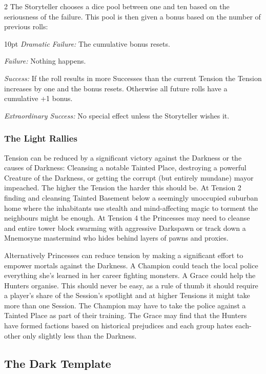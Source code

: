 \begin{multicols}{2}
The Storyteller chooses a dice pool between one and ten based on the seriousness of the failure. This pool is then given a bonus based on the number of previous rolls: 

\begin{myindentpar}{10pt}
    \emph{Dramatic Failure:} The cumulative bonus resets. 
    
    \emph{Failure:} Nothing happens. 
    
    \emph{Success:} If the roll results in more Successes than the current Tension the Tension increases by one and the bonus resets. Otherwise all future rolls have a cumulative +1 bonus. 
    
    \emph{Extraordinary Success:} No special effect unless the Storyteller wishes it. 
\end{myindentpar}

\subsubsection*{The Light Rallies}

Tension can be reduced by a significant victory against the Darkness or the causes of Darkness: Cleansing a notable Tainted Place, destroying a powerful Creature of the Darkness, or getting the corrupt (but entirely mundane) mayor impeached. The higher the Tension the harder this should be. At Tension 2 finding and cleansing Tainted Basement below a seemingly unoccupied suburban home where the inhabitants use stealth and mind-affecting magic to torment the neighbours might be enough. At Tension 4 the Princesses may need to cleanse and entire tower block swarming with aggressive Darkspawn or track down a Mnemosyne mastermind who hides behind layers of pawns and proxies. 

Alternatively Princesses can reduce tension by making a significant effort to empower mortals against the Darkness. A Champion could teach the local police everything she's learned in her career fighting monsters. A Grace could help the Hunters organise. This should never be easy, as a rule of thumb it should require a player's share of the Session's spotlight and at higher Tensions it might take more than one Session. The Champion may have to take the police against a Tainted Place as part of their training. The Grace may find that the Hunters have formed factions based on historical prejudices and each group hates each-other only slightly less than the Darkness. 

\subsection*{The Dark Template}
\label{sec:TheDarkTemplate}


\end{multicols}
